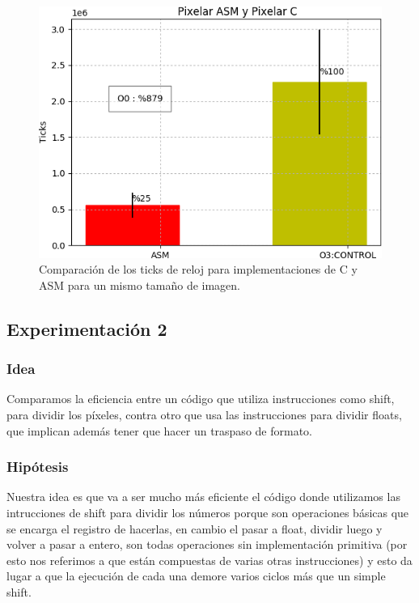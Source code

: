 \begin{figure}[H]
	\centering
	\captionsetup{justification=centering}
	\includegraphics[width = 10 cm, height = 6.5 cm]{imagenes/ASMvsCPixelar.png}
	\caption[center]{Comparación de los ticks de reloj para implementaciones de C y ASM para un mismo tamaño de imagen.}
\end{figure}


\subsection{Experimentación 2}
\subsubsection{Idea}
\par{Comparamos la eficiencia entre un código que utiliza instrucciones como shift, para dividir los píxeles, contra otro que usa las instrucciones para dividir floats, que implican además tener que hacer un traspaso de formato.}

\subsubsection{Hipótesis}
\par{Nuestra idea es que va a ser mucho más eficiente el código donde utilizamos las intrucciones de shift para dividir los números porque son operaciones básicas que se encarga el registro de hacerlas, en cambio el pasar a float, dividir luego y volver a pasar a entero, son todas operaciones sin implementación primitiva (por esto nos referimos a que están compuestas de varias otras instrucciones) y esto da lugar a que la ejecución de cada una demore varios ciclos más que un simple shift.}


